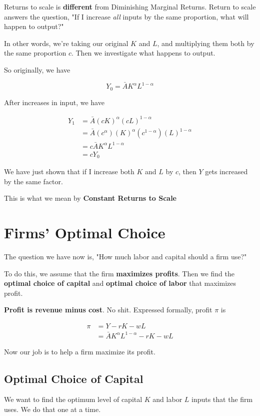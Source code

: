 \documentclass[11pt]{scrartcl}
\begin{document}
Returns to scale is \textbf{different} from Diminishing Marginal Returns. Return to scale answers the question, "If I increase \emph{all} inputs by the same proportion, what will happen to output?"

In other words, we're taking our original $K$ and $L$, and multiplying them both by the same proportion $c$. Then we investigate what happens to output.

So originally, we have

\[Y_0 = \bar{A} K^\alpha L^{1-\alpha} \]

After increases in input, we have

\begin{align*}
Y_1 &= \bar{A} (cK)^\alpha (cL)^{1-\alpha} \\
&= \bar{A} (c^\alpha)(K)^\alpha (c^{1-\alpha})(L)^{1-\alpha} \\
&= c\bar{A} K^\alpha L^{1-\alpha} \\
&= cY_0
\end{align*}

We have just shown that if I increase both $K$ and $L$ by $c$, then $Y$ gets increased by the same factor.

This is what we mean by \textbf{Constant Returns to Scale}

\section{Firms' Optimal Choice}
The question we have now is, "How much labor and capital should a firm use?"

To do this, we assume that the firm \textbf{maximizes profits}. Then we find the \textbf{optimal choice of capital} and \textbf{optimal choice of labor} that maximizes profit.

\textbf{Profit is revenue minus cost}. No shit. Expressed formally, profit $\pi$ is

\begin{align*}
\pi &= Y - rK - wL \\
&= \bar{A}K^{\alpha}L^{1-\alpha} - rK - wL
\end{align*}

Now our job is to help a firm maximize its profit.

\subsection{Optimal Choice of Capital}
We want to find the optimum level of capital $K$ and labor $L$ inputs that the firm uses. We do that one at a time.
\end{document}
